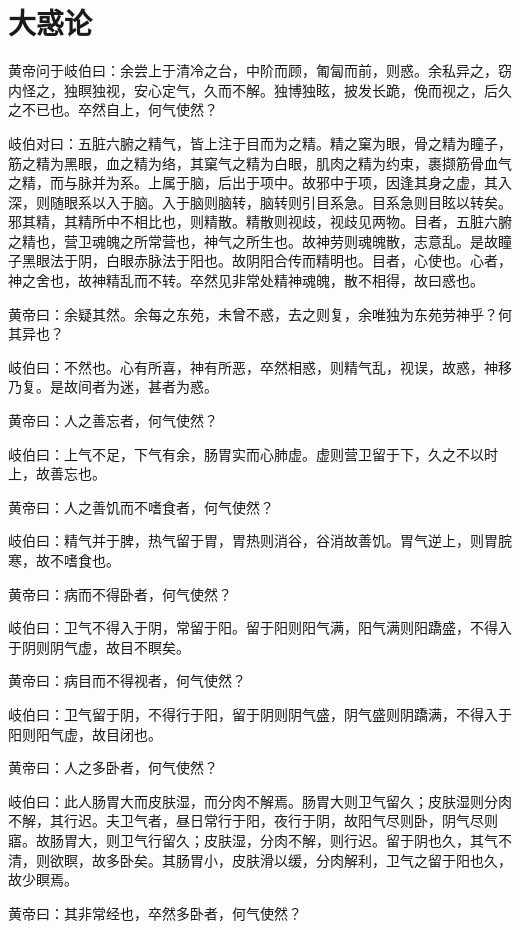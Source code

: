 \documentclass[a4paper,12pt,UTF8,twoside]{ctexbook}
\begin{document}
	\chapter{大惑论}
		
	黄帝问于岐伯曰：余尝上于清冷之台，中阶而顾，匍匐而前，则惑。余私异之，窃内怪之，独瞑独视，安心定气，久而不解。独博独眩，披发长跪，俛而视之，后久之不已也。卒然自上，何气使然？
	
	岐伯对曰：五脏六腑之精气，皆上注于目而为之精。精之窠为眼，骨之精为瞳子，筋之精为黑眼，血之精为络，其窠气之精为白眼，肌肉之精为约束，裹撷筋骨血气之精，而与脉并为系。上属于脑，后出于项中。故邪中于项，因逢其身之虚，其入深，则随眼系以入于脑。入于脑则脑转，脑转则引目系急。目系急则目眩以转矣。邪其精，其精所中不相比也，则精散。精散则视歧，视歧见两物。目者，五脏六腑之精也，营卫魂魄之所常营也，神气之所生也。故神劳则魂魄散，志意乱。是故瞳子黑眼法于阴，白眼赤脉法于阳也。故阴阳合传而精明也。目者，心使也。心者，神之舍也，故神精乱而不转。卒然见非常处精神魂魄，散不相得，故曰惑也。
	
	黄帝曰：余疑其然。余每之东苑，未曾不惑，去之则复，余唯独为东苑劳神乎？何其异也？
	
	岐伯曰：不然也。心有所喜，神有所恶，卒然相惑，则精气乱，视误，故惑，神移乃复。是故间者为迷，甚者为惑。
	
	黄帝曰：人之善忘者，何气使然？
	
	岐伯曰：上气不足，下气有余，肠胃实而心肺虚。虚则营卫留于下，久之不以时上，故善忘也。
	
	黄帝曰：人之善饥而不嗜食者，何气使然？
	
	岐伯曰：精气并于脾，热气留于胃，胃热则消谷，谷消故善饥。胃气逆上，则胃脘寒，故不嗜食也。
	
	黄帝曰：病而不得卧者，何气使然？
	
	岐伯曰：卫气不得入于阴，常留于阳。留于阳则阳气满，阳气满则阳蹻盛，不得入于阴则阴气虚，故目不瞑矣。
	
	黄帝曰：病目而不得视者，何气使然？
	
	岐伯曰：卫气留于阴，不得行于阳，留于阴则阴气盛，阴气盛则阴蹻满，不得入于阳则阳气虚，故目闭也。
	
	黄帝曰：人之多卧者，何气使然？
	
	岐伯曰：此人肠胃大而皮肤湿，而分肉不解焉。肠胃大则卫气留久；皮肤湿则分肉不解，其行迟。夫卫气者，昼日常行于阳，夜行于阴，故阳气尽则卧，阴气尽则寤。故肠胃大，则卫气行留久；皮肤湿，分肉不解，则行迟。留于阴也久，其气不清，则欲瞑，故多卧矣。其肠胃小，皮肤滑以缓，分肉解利，卫气之留于阳也久，故少瞑焉。
	
	黄帝曰：其非常经也，卒然多卧者，何气使然？
	
\end{document}
